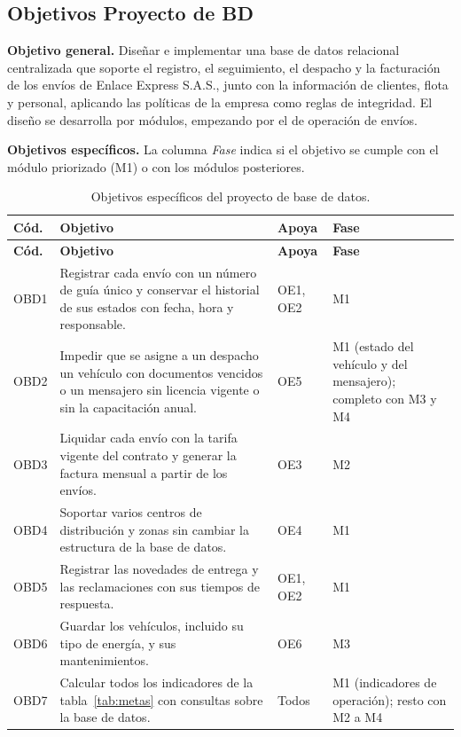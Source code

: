 \subsection{Objetivos Proyecto de BD}

\textbf{Objetivo general.} Diseñar e implementar una base de datos
relacional centralizada que soporte el registro, el seguimiento, el
despacho y la facturación de los envíos de Enlace Express S.A.S., junto
con la información de clientes, flota y personal, aplicando las
políticas de la empresa como reglas de integridad. El diseño se
desarrolla por módulos, empezando por el de operación de envíos.

\textbf{Objetivos específicos.} La columna \textit{Fase} indica si el
objetivo se cumple con el módulo priorizado (M1) o con los módulos
posteriores.

{\singlespacing\small
\begin{longtable}{L{1.2cm} L{8.6cm} L{1.4cm} L{3.0cm}}
\caption{Objetivos específicos del proyecto de base de datos.}
\label{tab:obd}\\
\toprule
\textbf{Cód.} & \textbf{Objetivo} & \textbf{Apoya} & \textbf{Fase} \\
\midrule
\endfirsthead
\toprule
\textbf{Cód.} & \textbf{Objetivo} & \textbf{Apoya} & \textbf{Fase} \\
\midrule
\endhead
\bottomrule
\endfoot
OBD1 & Registrar cada envío con un número de guía único y conservar el historial de sus estados con fecha, hora y responsable. & OE1, OE2 & M1 \\
OBD2 & Impedir que se asigne a un despacho un vehículo con documentos vencidos o un mensajero sin licencia vigente o sin la capacitación anual. & OE5 & M1 (estado del vehículo y del mensajero); completo con M3 y M4 \\
OBD3 & Liquidar cada envío con la tarifa vigente del contrato y generar la factura mensual a partir de los envíos. & OE3 & M2 \\
OBD4 & Soportar varios centros de distribución y zonas sin cambiar la estructura de la base de datos. & OE4 & M1 \\
OBD5 & Registrar las novedades de entrega y las reclamaciones con sus tiempos de respuesta. & OE1, OE2 & M1 \\
OBD6 & Guardar los vehículos, incluido su tipo de energía, y sus mantenimientos. & OE6 & M3 \\
OBD7 & Calcular todos los indicadores de la tabla~\ref{tab:metas} con consultas sobre la base de datos. & Todos & M1 (indicadores de operación); resto con M2 a M4 \\
\end{longtable}
\par}

